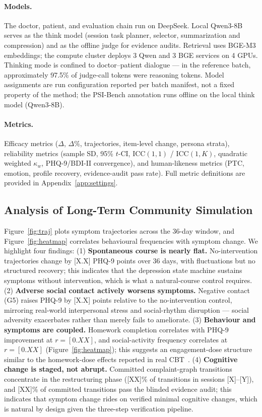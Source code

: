 \documentclass[10pt]{article}
\begin{document}
\paragraph{Models.}
The doctor, patient, and evaluation chain run on DeepSeek.
Local Qwen3-8B serves as the think model (session task planner, selector, summarization and compression) and as the offline judge for evidence audits.
Retrieval uses BGE-M3 embeddings; the compute cluster deploys 3 Qwen and 3 BGE services on 4 GPUs.
Thinking mode is confined to doctor--patient dialogue --- in the reference batch, approximately 97.5\% of judge-call tokens were reasoning tokens.
Model assignments are run configuration reported per batch manifest, not a fixed property of the method; the PSI-Bench annotation runs offline on the local think model (Qwen3-8B).

\paragraph{Metrics.}
Efficacy metrics ($\Delta$, $\Delta\%$, trajectories, item-level change, persona strata), reliability metrics (sample SD, 95\% $t$-CI, ICC$(1,1)$ / ICC$(1,K)$, quadratic weighted $\kappa_w$, PHQ-9/BDI-II convergence), and human-likeness metrics (PTC, emotion, profile recovery, evidence-audit pass rate).
Full metric definitions are provided in Appendix~\ref{app:settings}.

\subsection{Analysis of Long-Term Community Simulation}\label{sec:simanalysis}

Figure~\ref{fig:traj} plots symptom trajectories across the 36-day window, and Figure~\ref{fig:heatmap} correlates behavioural frequencies with symptom change.
We highlight four findings:
(1) \textbf{Spontaneous course is nearly flat.} No-intervention trajectories change by [X.X] PHQ-9 points over 36 days, with fluctuations but no structured recovery; this indicates that the depression state machine sustains symptoms without intervention, which is what a natural-course control requires.
(2) \textbf{Adverse social contact actively worsens symptoms.} Negative contact (G5) raises PHQ-9 by [X.X] points relative to the no-intervention control, mirroring real-world interpersonal stress and social-rhythm disruption --- social adversity exacerbates rather than merely fails to ameliorate.
(3) \textbf{Behaviour and symptoms are coupled.} Homework completion correlates with PHQ-9 improvement at $r = [0.XX]$, and social-activity frequency correlates at $r = [0.XX]$ (Figure~\ref{fig:heatmap}); this suggests an engagement-dose structure similar to the homework-dose effects reported in real CBT~\citep{burns2001}.
(4) \textbf{Cognitive change is staged, not abrupt.} Committed complaint-graph transitions concentrate in the restructuring phase ([XX]\% of transitions in sessions [X]--[Y]), and [XX]\% of committed transitions pass the blinded evidence audit; this indicates that symptom change rides on verified minimal cognitive changes, which is natural by design given the three-step verification pipeline.
\end{document}
